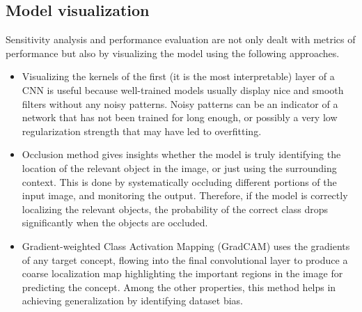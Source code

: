 \subsection{Model visualization}
Sensitivity analysis and performance evaluation are not only dealt with metrics of performance but also by visualizing the model using the following approaches.
\begin{itemize}
	\item Visualizing the kernels of the first (it is the most interpretable) layer of a CNN is useful because well-trained models usually display nice and smooth filters without any noisy patterns. Noisy patterns can be an indicator of a network that has not been trained for long enough, or possibly a very low regularization strength that may have led to overfitting.
	\vspace{-5pt}
	\item Occlusion method gives insights whether the model is truly identifying the location of the relevant object in the image, or just using the surrounding context. This is done by systematically occluding different portions of the input image, and monitoring the output. Therefore, if the model is correctly localizing the relevant objects, the probability of the correct class drops significantly when the objects are occluded.
	\vspace{-5pt}
	\item Gradient-weighted Class Activation Mapping (GradCAM) uses the gradients of any target concept, flowing into the final convolutional layer to produce a coarse localization map highlighting the important regions in the image for predicting the concept. Among the other properties, this method helps in achieving generalization by identifying dataset bias.
\end{itemize}
